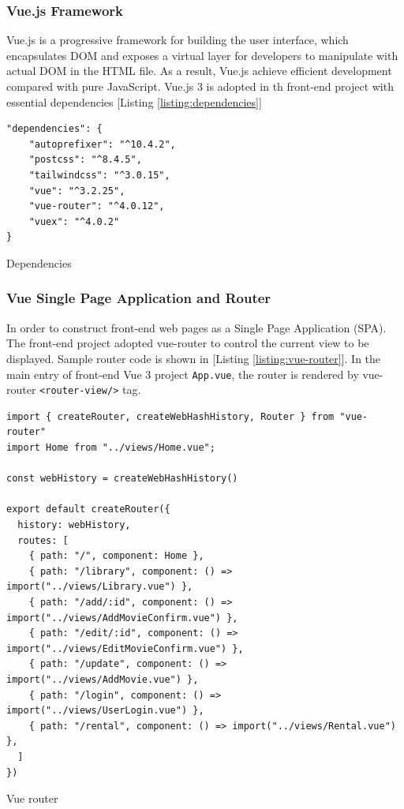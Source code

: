 \documentclass{article}
\begin{document}
\subsubsection{Vue.js Framework}

Vue.js is a progressive framework for building the user interface, which encapsulates DOM and exposes a virtual layer for developers to manipulate with actual DOM in the HTML file. As a result, Vue.js achieve efficient development compared with pure JavaScript. Vue.js 3 is adopted in th front-end project with essential dependencies [Listing \ref{listing:dependencies}]
\begin{listing}[!htp]
\begin{verbatim}
"dependencies": {
    "autoprefixer": "^10.4.2",
    "postcss": "^8.4.5",
    "tailwindcss": "^3.0.15",
    "vue": "^3.2.25",
    "vue-router": "^4.0.12",
    "vuex": "^4.0.2"
}
\end{verbatim}
\caption{Dependencies}
\label{listing:dependencies}
\end{listing}

\subsubsection{Vue Single Page Application and Router}

In order to construct front-end web pages as a Single Page Application (SPA). The front-end project adopted vue-router to control the current view to be displayed. Sample router code is shown in [Listing \ref{listing:vue-router}]. In the main entry of front-end Vue 3 project \verb|App.vue|, the router is rendered by vue-router \verb|<router-view/>| tag.

\begin{listing}[!htp]
\begin{verbatim}
import { createRouter, createWebHashHistory, Router } from "vue-router"
import Home from "../views/Home.vue";

const webHistory = createWebHashHistory()

export default createRouter({
  history: webHistory,
  routes: [
    { path: "/", component: Home },
    { path: "/library", component: () => import("../views/Library.vue") },
    { path: "/add/:id", component: () => import("../views/AddMovieConfirm.vue") },
    { path: "/edit/:id", component: () => import("../views/EditMovieConfirm.vue") },
    { path: "/update", component: () => import("../views/AddMovie.vue") },
    { path: "/login", component: () => import("../views/UserLogin.vue") },
    { path: "/rental", component: () => import("../views/Rental.vue") },
  ]
})
\end{verbatim}
\caption{Vue router}
\label{listing:vue-router}
\end{listing}
\end{document}
